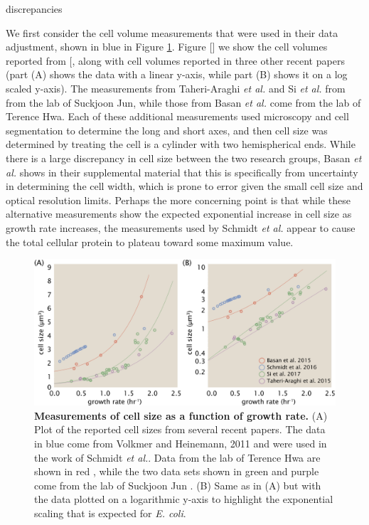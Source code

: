 discrepancies \documentclass[11pt, letterpaper]{article}
\begin{document}
We first consider the cell volume measurements that were used in their data
adjustment, shown in blue in Figure \ref{fig:cell_size_literature}. Figure [] we
show the cell volumes reported from [, along with cell volumes reported in three
other recent papers  (part (A) shows the data with a linear y-axis, while part
(B) shows it on a log scaled y-axis). The measurements from Taheri-Araghi {\it
et al.} and Si {\it et al.} from from the lab of Suckjoon Jun, while those from
Basan {\it et al.} come  from the lab of Terence Hwa.  Each of these additional
measurements used microscopy and cell segmentation to determine the long and
short axes, and then cell size was determined by treating the cell is a cylinder
with two hemispherical ends. While there is a large discrepancy in cell size
between the two research groups, Basan {\it et al.} shows in their  supplemental
material that this is specifically from uncertainty in determining the cell
width, which  is prone to error given the small cell size and optical resolution
limits. Perhaps the more concerning point  is that while these alternative
measurements show the expected exponential increase in  cell size as growth rate
increases, the measurements used by Schmidt {\it et al.} appear to cause the
total cellular protein  to plateau toward some maximum value.

\begin{figure}[H]
		\centering
    \includegraphics[width=1\textwidth]{../../figures/supplemental_cell_volumes.pdf}
  \caption{{\bf Measurements of cell size as a function of growth rate.}
	 	(A) Plot of the reported cell sizes from several recent papers.  The data in blue come from
		Volkmer and Heinemann, 2011 \cite{Volkmer2011} and were used in the work of Schmidt {\it et al.}.
		Data from the lab of Terence Hwa are shown in red \cite{Basan2015}, while the two
		data sets shown in green and purple come from the lab of Suckjoon Jun \cite{TaheriAraghi2015, Si2017}.
		(B) Same as in (A) but with the data plotted on a logarithmic y-axis to highlight the
		exponential scaling that is expected for {\it E. coli}.}
  \label{fig:cell_size_literature}
\end{figure}
\end{document}
